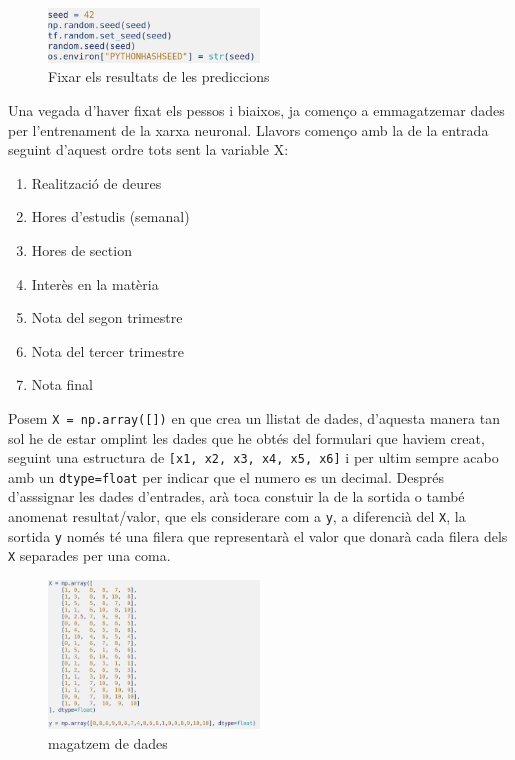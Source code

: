 \begin{figure}[H]
    \centering
    \includegraphics[width=0.5\textwidth]{./figures/22.png}
    \caption{Fixar els resultats de les prediccions}
\end{figure}


Una vegada d'haver fixat els pessos i biaixos, ja començo a emmagatzemar dades per l'entrenament de la xarxa neuronal. Llavors començo amb la de la entrada seguint d'aquest ordre tots sent la variable X:
 \begin{enumerate}
 \item Realització de deures
 \item Hores d'estudis (semanal)
 \item Hores de section
 \item Interès en la matèria
 \item Nota del segon trimestre
 \item Nota del tercer trimestre
 \item Nota final
 \end{enumerate}
 Posem \texttt{X = np.array([])} en que crea un llistat de dades, d'aquesta manera tan sol he de estar omplint les dades que he obtés del formulari que haviem creat, seguint una estructura de \texttt{[x1, x2, x3, x4, x5, x6]} i per ultim sempre acabo amb un \texttt{dtype=float} per indicar que el numero es un decimal.
 Després d'asssignar les dades d'entrades, arà toca constuir la de la sortida o també anomenat resultat/valor, que els considerare com a \texttt{y}, a diferencià del \texttt{X}, la sortida \texttt{y} només té una filera que representarà el valor que donarà cada filera dels \texttt{X} separades per una coma.
\begin{figure}[H]
    \centering
    \includegraphics[width=0.5\textwidth]{./figures/23.png}
    \caption{magatzem de dades}
\end{figure}







